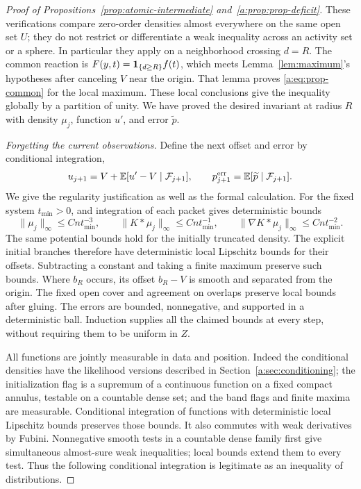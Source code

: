 \begin{proof}[Proof of Propositions~\ref{prop:atomic-intermediate} and~\ref{a:prop:prop-deficit}]
These verifications compare zero-order densities almost everywhere
on the same open set $U$; they do not restrict or differentiate a weak
inequality across an activity set or a sphere.  In particular they
apply on a neighborhood crossing $d=R$.  The common reaction is
$F(y,t)=\mathbf 1_{\{d\ge R\}}f(t)$, which meets
Lemma~\ref{lem:maximum}'s hypotheses after canceling $V$ near
the origin.  That lemma proves \eqref{a:eq:prop-common} for the local
maximum.  These local conclusions give the inequality globally by
a partition of unity.  We have proved the desired invariant at radius
$R$ with density $\mu_j$, function $u'$, and error $\widetilde p$.

\emph{Forgetting the current observations.}
Define the next offset and error by conditional integration,
\[
 u_{j+1}=V+\mathbb E[u'-V\mid\mathcal F_{j+1}],\qquad
 p_{j+1}^{\mathrm{err}}=\mathbb E[\widetilde p\mid\mathcal F_{j+1}].
\]
We give the regularity justification as well as the formal calculation.
For the fixed system $t_{\min}>0$, and integration of each packet
gives deterministic bounds
\[
 \|\mu_j\|_\infty\le Cnt_{\min}^{-3},\qquad
 \|K*\mu_j\|_\infty\le Cnt_{\min}^{-1},\qquad
 \|\nabla K*\mu_j\|_\infty\le Cnt_{\min}^{-2}.
\]
The same potential bounds hold for the initially truncated density.
The explicit initial branches therefore have deterministic local
Lipschitz bounds for their offsets.  Subtracting a constant and taking
a finite maximum preserve such bounds.  Where $b_R$ occurs, its
offset $b_R-V$ is smooth and separated from the origin.  The fixed
open cover and agreement on overlaps preserve local bounds after
gluing.  The errors are bounded, nonnegative, and supported in a
deterministic ball.  Induction supplies all the claimed bounds at
every step, without requiring them to be uniform in $Z$.

All functions are jointly measurable in data and position.  Indeed
the conditional densities have the likelihood versions described in
Section~\ref{a:sec:conditioning}; the initialization flag is a supremum
of a continuous function on a fixed compact annulus, testable on a
countable dense set; and the band flags and finite maxima are measurable.
Conditional integration of functions with deterministic local
Lipschitz bounds preserves those bounds.  It also commutes with weak
derivatives by Fubini.  Nonnegative smooth tests in a countable dense
family first give simultaneous almost-sure weak inequalities; local
bounds extend them to every test.  Thus the following conditional
integration is legitimate as an inequality of distributions.


\end{proof}
